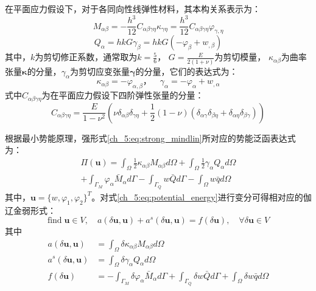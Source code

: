 在平面应力假设下，对于各同向性线弹性材料，其本构关系表示为：
\begin{equation}\label{ch_5:eq:mindlin_M}
    M_{\alpha \beta}=-\frac{h^3}{12}C_{\alpha \beta \gamma\eta}\kappa_{\gamma\eta}=\frac{h^3}{12}C_{\alpha \beta \gamma\eta}\varphi_{\gamma,\eta}
\end{equation}
\begin{equation}\label{ch_5:eq:mindlin_Q}
    Q_{\alpha}= hkG\gamma_\beta =hkG(-\varphi_\beta+w_{,\beta})
\end{equation}
其中，$k$为剪切修正系数，通常取为$k=\frac{5}{6}$，
$G = \frac{E}{2(1+\nu)}$为剪切模量，
$\kappa_{\alpha\beta}$为曲率张量$\pmb\kappa$的分量，$\gamma_\alpha$为剪切应变张量$\pmb\gamma$的分量，它们的表达式为：
\begin{equation} \label{ch_5:eq:kappa}
    \kappa_{\alpha\beta}=-\varphi_{\alpha,\beta}，\quad\gamma_\alpha=-\varphi_\alpha+w_{,\alpha}
\end{equation}
式中$C_{\alpha \beta \gamma\eta}$为在平面应力假设下四阶弹性张量的分量：
\begin{equation} 
    C_{\alpha \beta \gamma\eta}=\frac{E}{1-\nu^2}(\nu\delta_{\alpha\beta}\delta_{\gamma\eta}+\frac{1}{2}(1-\nu)(\delta_{\alpha\gamma}\delta_{\beta\eta}+\delta_{\alpha\eta}\delta_{\beta\gamma}))
\end{equation}

根据最小势能原理，强形式\eqref{ch_5:eq:strong_mindlin}所对应的势能泛函表达式为： 
\begin{multline}\label{ch_5:eq:potential_energy}
    \Pi(\boldsymbol{u}) =\int_{\Omega}\frac{1}{2}\kappa_{\alpha\beta}M_{\alpha\beta}d\Omega +\int_{\Omega}\frac{1}{2}\gamma_{\alpha}Q_{\alpha}d\Omega\\
    +\int_{\Gamma_{M}}\varphi_{\alpha}{\bar{M}_{\alpha}}d\Gamma-\int_{\Gamma_{Q}}{w}\bar {Q}d\Gamma-\int_{\Omega} w\bar{q}d\Omega
\end{multline}
其中，$\boldsymbol u = \{w, \varphi_1, \varphi_2\}^T$。对式\eqref{ch_5:eq:potential_energy}进行变分可得相对应的伽辽金弱形式：
\begin{equation}\label{ch_5:eq:weak_penalty_mindlin}
    \text{find}\; \boldsymbol u \in V, \quad
    a(\delta \boldsymbol u, \boldsymbol u) +
    a^s(\delta \boldsymbol u, \boldsymbol u) = 
    f(\delta \boldsymbol u)
    ,\quad \forall \delta \boldsymbol u \in V
\end{equation}
其中
\begin{align}
    a(\delta \boldsymbol u, \boldsymbol u) &= \int_{\Omega}\delta\kappa_{\alpha\beta}M_{\alpha\beta}d\Omega \\
    a^s(\delta \boldsymbol u, \boldsymbol u) &= \int_{\Omega}\delta\gamma_{\alpha}Q_{\alpha}d\Omega \\
    f(\delta \boldsymbol u) &= 
    -\int_{\Gamma_{M}}\delta\varphi_{\alpha}{\bar{M}_{\alpha}}d\Gamma+\int_{\Gamma_{Q}}{\delta{w}}\bar {Q}d\Gamma+\int_{\Omega} \delta{w}\bar{q}d\Omega
\end{align}

